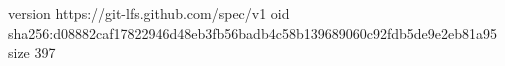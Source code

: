 version https://git-lfs.github.com/spec/v1
oid sha256:d08882caf17822946d48eb3fb56badb4c58b139689060c92fdb5de9e2eb81a95
size 397

